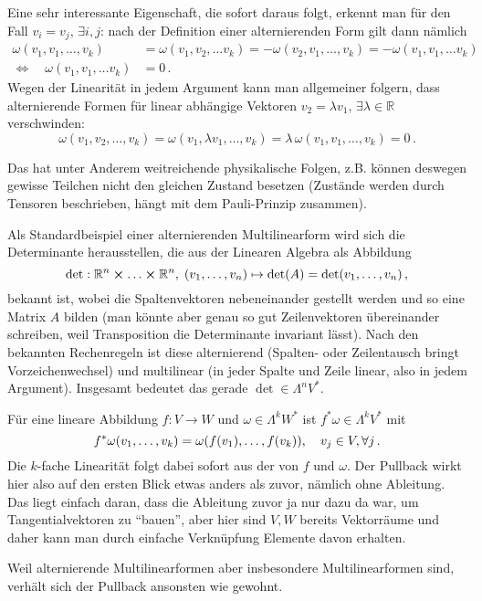 \documentclass[../H_Analysis_main.tex]{subfiles}
\begin{document}
Eine sehr interessante Eigenschaft, die sofort daraus folgt, erkennt man für den Fall $v_i = v_j, \, \exists i, j$: nach der Definition einer alternierenden Form gilt dann nämlich
\begin{align*}
\omega(v_1, v_1, \dots, v_k) &= \omega(v_1, v_2, \dots v_k) = - \omega(v_2, v_1, \dots, v_k) = - \omega(v_1, v_1, \dots v_k)
\\
\Leftrightarrow \quad \omega(v_1, v_1, \dots v_k) &= 0 \, .
\end{align*}
Wegen der Linearität in jedem Argument kann man allgemeiner folgern, dass alternierende Formen für linear abhängige Vektoren $v_2 = \lambda v_1, \, \exists \lambda \in \mathbb{R}$ verschwinden:
\begin{equation*}
\omega(v_1, v_2, \dots, v_k) = \omega(v_1, \lambda v_1, \dots, v_k) = \lambda \, \omega(v_1, v_1, \dots, v_k) = 0 \, .
\end{equation*}

Das hat unter Anderem weitreichende physikalische Folgen, z.B. können deswegen gewisse Teilchen nicht den gleichen Zustand besetzen (Zustände werden durch Tensoren beschrieben, hängt mit dem Pauli-Prinzip zusammen).

\begin{bsp}[Determinante]\label{bsp:stdbspdet}
Als Standardbeispiel einer alternierenden Multilinearform wird sich die Determinante herausstellen, die aus der Linearen Algebra als Abbildung
\begin{equation}
\det: \mathbb{R}^n \cross \dots \cross \mathbb{R}^n, \; (v_1, \dots, v_n) \mapsto \det(A) = \det(v_1, \dots, v_n) \, ,
\end{equation}
bekannt ist, wobei die Spaltenvektoren nebeneinander gestellt werden und so eine Matrix $A$ bilden (man könnte aber genau so gut Zeilenvektoren übereinander schreiben, weil Transposition die Determinante invariant lässt). Nach den bekannten Rechenregeln ist diese alternierend (Spalten- oder Zeilentausch bringt Vorzeichenwechsel) und multilinear (in jeder Spalte und Zeile linear, also in jedem Argument). Insgesamt bedeutet das gerade $\det \in \Lambda^n V^*$.
\end{bsp}

\begin{bsp}[Pullback]\label{bsp:pullbackkform}
Für eine lineare Abbildung $f: V \rightarrow W$ und $\omega \in \Lambda^k W^*$ ist $f^* \omega \in \Lambda^k V^*$ mit
\begin{equation}
f^* \omega(v_1, \dots, v_k) = \omega\qty(f(v_1), \dots, f(v_k)), \quad v_j \in V, \forall j \, .
\end{equation}
Die $k$-fache Linearität folgt dabei sofort aus der von $f$ und $\omega$. Der Pullback wirkt hier also auf den ersten Blick etwas anders als zuvor, nämlich ohne Ableitung. Das liegt einfach daran, dass die Ableitung zuvor ja nur dazu da war, um Tangentialvektoren zu \enquote{bauen}, aber hier sind $V, W$ bereits Vektorräume und daher kann man durch einfache Verknüpfung Elemente davon erhalten.

Weil alternierende Multilinearformen aber insbesondere Multilinearformen sind, verhält sich der Pullback ansonsten wie gewohnt.
\end{bsp}
\end{document}
